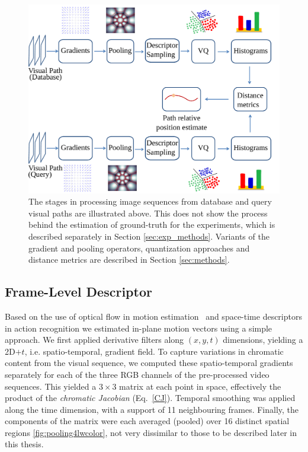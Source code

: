 \begin{figure}
\begin{center}
\includegraphics[width=\textwidth]{./gfx/Chapter04/pipeline.pdf}
\caption{The stages in processing image sequences from database and query visual paths are illustrated above.  This does not show the process behind the estimation of ground-truth for the experiments, which is described separately in Section \ref{sec:exp_methods}.  Variants of the gradient and pooling operators, quantization approaches and distance metrics are described in Section \ref{sec:methods}.}
\label{fig:FigPipeline}
\end{center}
\end{figure}

\subsection{Frame-Level Descriptor}
Based on the use of optical flow in motion estimation~\citep{Weickert2006} and space-time descriptors in action recognition \citep{Wang2009} we estimated in-plane motion vectors using a simple approach.  We first applied derivative filters along $(x,y,t)$ dimensions, yielding a 2D$+t$, i.e. spatio-temporal, gradient field.  To capture variations in chromatic content from the visual sequence, we computed these spatio-temporal gradients separately for each of the three RGB channels of the pre-processed video sequences.  This yielded a $3\times 3$ matrix at each point in space, effectively the product of the \textit{chromatic Jacobian} (Eq.~\ref{CJ}).  Temporal smoothing was applied along the time dimension, with a support of 11 neighbouring frames. Finally, the components of the matrix were each averaged (pooled) over 16 distinct spatial regions \ref{fig:pooling4lwcolor}, not very dissimilar to those to be described later in this thesis. 



